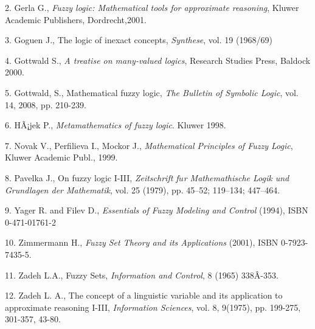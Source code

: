 \documentclass[12pt]{article}
\begin{document}
2. Gerla G., {\em Fuzzy logic: Mathematical tools for approximate reasoning}, Kluwer Academic Publishers, Dordrecht,2001.

3. Goguen J., The logic of inexact concepts,  {\em Synthese}, vol. 19 (1968/69)

4. Gottwald S., {\em A treatise on many-valued logics}, Research Studies Press, Baldock 2000.

5. Gottwald, S., Mathematical fuzzy logic, {\em The Bulletin of Symbolic Logic}, vol. 14, 2008, pp. 210-239.

6. HÃ¡jek P., {\em Metamathematics of fuzzy logic}. Kluwer 1998.

7. Novak V., Perfilieva I., Mockor J., {\em Mathematical Principles of Fuzzy Logic}, Kluwer Academic Publ., 1999.

8. Pavelka J.,  On fuzzy logic I-III, {\em Zeitschrift f$\ddot{u}$r Mathemathische Logik
  und Grundlagen der Mathematik}, vol. 25 (1979), pp. 45--52; 119--134; 447--464.

9. Yager R. and Filev D., {\em Essentials of Fuzzy Modeling and Control} (1994), ISBN 0-471-01761-2 

10. Zimmermann H., {\em Fuzzy Set Theory and its Applications} (2001), ISBN 0-7923-7435-5.

11. Zadeh L.A., Fuzzy Sets, {\em Information and Control}, 8 (1965) 338Â­-353.

12. Zadeh L. A., The concept of a linguistic variable and its application to approximate reasoning I-III, {\em Information Sciences}, vol. 8, 9(1975), pp. 199-275, 301-357, 43-80.

\end{document}

